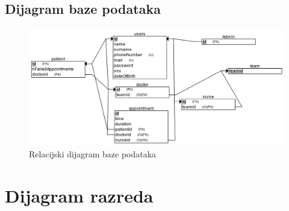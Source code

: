 			\subsection{Dijagram baze podataka}
				\begin{figure}[H]
			            \includegraphics[width=\textwidth]{slike/relacijski.png} %
			            \caption{Relacijski dijagram baze podataka}
			            \label{fig:promjene2} %
		            \end{figure}
		            
			
			\eject
			
			
		\section{Dijagram razreda}
		
			
			
			
